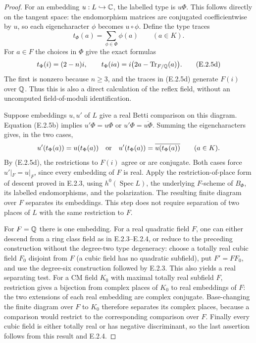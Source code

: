 \begin{proof}
For an embedding $u:L\hookrightarrow\mathbb C$, the labelled type is $u\Phi$. This follows directly on the tangent space: the endomorphism matrices are conjugated coefficientwise by $u$, so each eigencharacter $\phi$ becomes $u\circ\phi$. Define the type traces
\[
 t_\Phi(a)=\sum_{\phi\in\Phi}\phi(a)\qquad(a\in K).
\]
For $a\in F$ the choices in $\Phi$ give the exact formulas
\[
 t_\Phi(i)=(2-n)i,
 \qquad
 t_\Phi(ia)=i\bigl(2a-\operatorname{Tr}_{F/\mathbb Q}(a)\bigr).
 \tag{E.2.5d}
\]
The first is nonzero because $n\ge3$, and the traces in (E.2.5d) generate $F(i)$ over $\mathbb Q$. Thus this is also a direct calculation of the reflex field, without an uncomputed field-of-moduli identification.

Suppose embeddings $u,u'$ of $L$ give a real Betti comparison on this diagram. Equation (E.2.5b) implies $u'\Phi=u\Phi$ or $u'\Phi=\overline{u\Phi}$. Summing the eigencharacters gives, in the two cases,
\[
 u'(t_\Phi(a))=u(t_\Phi(a))
 \quad\hbox{or}\quad
 u'(t_\Phi(a))=\overline{u(t_\Phi(a))}
                       \qquad(a\in K).
\]
By (E.2.5d), the restrictions to $F(i)$ agree or are conjugate. Both cases force $u'|_F=u|_F$, since every embedding of $F$ is real. Apply the restriction-of-place form of descent proved in E.2.3, using $h^0(\operatorname{Spec}L)$, the underlying $F$-scheme of $B_\Phi$, its labelled endomorphisms, and the polarization. The resulting finite diagram over $F$ separates its embeddings. This step does not require separation of two places of $L$ with the same restriction to $F$.

For $F=\mathbb Q$ there is one embedding. For a real quadratic field $F$, one can either descend from a ring class field as in E.2.3--E.2.4, or reduce to the preceding construction without the degree-two type degeneracy: choose a totally real cubic field $F_0$ disjoint from $F$ (a cubic field has no quadratic subfield), put $F'=FF_0$, and use the degree-six construction followed by E.2.3. This also yields a real separating test. For a CM field $K_0$ with maximal totally real subfield $F$, restriction gives a bijection from complex places of $K_0$ to real embeddings of $F$: the two extensions of each real embedding are complex conjugate. Base-changing the finite diagram over $F$ to $K_0$ therefore separates its complex places, because a comparison would restrict to the corresponding comparison over $F$. Finally every cubic field is either totally real or has negative discriminant, so the last assertion follows from this result and E.2.4.
\end{proof}

